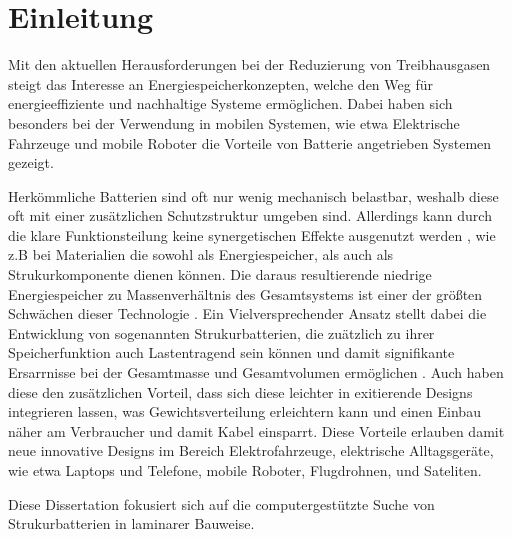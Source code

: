 \chapter[Einleitung]{\label{sec:Einleitung}Einleitung}
Mit den aktuellen Herausforderungen bei der Reduzierung von Treibhausgasen steigt das Interesse an Energiespeicherkonzepten, welche den Weg für energieeffiziente und nachhaltige Systeme ermöglichen. Dabei haben sich besonders bei der Verwendung in mobilen Systemen, wie etwa Elektrische Fahrzeuge \cite{Huo2015, Donateo2015,Jochem2015,Kim2014,Orsi2016,Silva2011,Holdway2010,Sternberg2015,Ramachandran2015} und mobile Roboter \cite{Hecht2023,Mikolajczyk2023,Ghobadpour2023,Wang2020} die Vorteile von Batterie angetrieben Systemen gezeigt.

Herkömmliche Batterien sind oft nur wenig mechanisch belastbar, weshalb diese oft mit einer zusätzlichen Schutzstruktur umgeben sind. Allerdings kann durch die klare Funktionsteilung keine synergetischen Effekte ausgenutzt werden , wie z.B bei Materialien die sowohl als Energiespeicher, als auch als Strukurkomponente dienen können. Die daraus resultierende niedrige Energiespeicher zu Massenverhältnis des Gesamtsystems ist einer der größten Schwächen dieser Technologie \cite{Armand2020,Schaefer2018, Cano2018,Goodenough2009}. Ein Vielversprechender Ansatz stellt dabei die Entwicklung von sogenannten Strukurbatterien, die zuätzlich zu ihrer Speicherfunktion auch Lastentragend sein können \cite{Johannisson2018, Danzi2021, Wetzel2004, Thomas2004, Liu2009, Ekstedt2010, Wang2019, Asp2019, Moyer2020, Zhao2020, Yin2020, Wang2020, Lutkenhaus2020, Fu2021, Jin2021, Kalnaus2021, Wong2007, Carlson2013, Xu2022} und damit signifikante Ersarrnisse bei der Gesamtmasse und Gesamtvolumen ermöglichen \cite{Wetzel2004, Snyder2015, Carlstedt2020a, Asp2014, Johannisson2019}. Auch haben diese den zusätzlichen Vorteil, dass sich diese leichter in exitierende Designs integrieren lassen, was Gewichtsverteilung erleichtern kann und einen Einbau näher am Verbraucher und damit Kabel einsparrt. Diese Vorteile erlauben damit neue innovative Designs im Bereich Elektrofahrzeuge, elektrische Alltagsgeräte, wie etwa Laptops und Telefone, mobile Roboter, Flugdrohnen, und Sateliten.

Diese Dissertation fokusiert sich auf die computergestützte Suche von Strukurbatterien in laminarer Bauweise.


